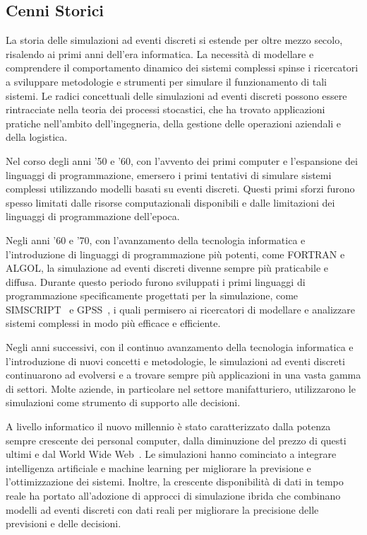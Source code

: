 \documentclass[12pt,a4paper,openright,twoside]{book}
\begin{document}
\subsection{Cenni Storici}
La storia delle simulazioni ad eventi discreti si estende per oltre mezzo secolo, risalendo ai primi anni dell'era informatica. La necessità di modellare e comprendere il comportamento dinamico dei sistemi complessi spinse i ricercatori a sviluppare metodologie e strumenti per simulare il funzionamento di tali sistemi.
Le radici concettuali delle simulazioni ad eventi discreti possono essere rintracciate nella teoria dei processi stocastici, che ha trovato applicazioni pratiche nell'ambito dell'ingegneria, della gestione delle operazioni aziendali e della logistica. 

Nel corso degli anni '50 e '60, con l'avvento dei primi computer e l'espansione dei linguaggi di programmazione, emersero i primi tentativi di simulare sistemi complessi utilizzando modelli basati su eventi discreti. Questi primi sforzi furono spesso limitati dalle risorse computazionali disponibili e dalle limitazioni dei linguaggi di programmazione dell'epoca.

Negli anni '60 e '70, con l'avanzamento della tecnologia informatica e l'introduzione di linguaggi di programmazione più potenti, come FORTRAN e ALGOL, la simulazione ad eventi discreti divenne sempre più praticabile e diffusa. Durante questo periodo furono sviluppati i primi linguaggi di programmazione specificamente progettati per la simulazione, come SIMSCRIPT~\cite{DBLP:journals/ibmsj/DimsdaleM64} e GPSS~\cite{DBLP:journals/tssc/HollandM68}, i quali permisero ai ricercatori di modellare e analizzare sistemi complessi in modo più efficace e efficiente.

Negli anni successivi, con il continuo avanzamento della tecnologia informatica e l'introduzione di nuovi concetti e metodologie, le simulazioni ad eventi discreti continuarono ad evolversi e a trovare sempre più applicazioni in una vasta gamma di settori. 
Molte aziende, in particolare nel settore manifatturiero, utilizzarono le simulazioni come strumento di supporto alle decisioni. 

A livello informatico il nuovo millennio è stato caratterizzato dalla potenza sempre crescente dei personal computer, dalla diminuzione del prezzo di questi ultimi e dal World Wide Web~\cite{DBLP:journals/jors/Robinson05}. Le simulazioni hanno cominciato a integrare intelligenza artificiale e machine learning per migliorare la previsione e l'ottimizzazione dei sistemi. Inoltre, la crescente disponibilità di dati in tempo reale ha portato all'adozione di approcci di simulazione ibrida che combinano modelli ad eventi discreti con dati reali per migliorare la precisione delle previsioni e delle decisioni.
\end{document}
